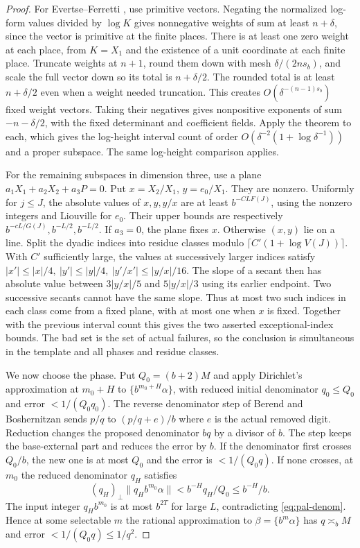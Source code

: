 \begin{proof}
For Evertse--Ferretti \cite[Theorem~3.3]{EF}, use primitive vectors. Negating the normalized log-form values divided by \(\log K\) gives nonnegative weights of sum at least \(n+\delta\), since the vector is primitive at the finite places. There is at least one zero weight at each place, from \(K=X_1\) and the existence of a unit coordinate at each finite place. Truncate weights at \(n+1\), round them down with mesh \(\delta/(2n s_b)\), and scale the full vector down so its total is \(n+\delta/2\). The rounded total is at least \(n+\delta/2\) even when a weight needed truncation. This creates \(O(\delta^{-(n-1)s_b})\) fixed weight vectors. Taking their negatives gives nonpositive exponents of sum \(-n-\delta/2\), with the fixed determinant and coefficient fields. Apply the theorem to each, which gives the log-height interval count of order \(O(\delta^{-2}(1+\log\delta^{-1}))\) and a proper subspace. The same log-height comparison applies.

For the remaining subspaces in dimension three, use a plane \(a_1X_1+a_2X_2+a_3P=0\). Put \(x=X_2/X_1\), \(y=e_0/X_1\). They are nonzero. Uniformly for \(j\le J\), the absolute values of \(x,y,y/x\) are at least \(b^{-C LF(J)}\), using the nonzero integers and Liouville for \(e_0\). Their upper bounds are respectively \(b^{-cL/G(J)}, b^{-L/2}, b^{-L/2}\). If \(a_3=0\), the plane fixes \(x\). Otherwise \((x,y)\) lie on a line. Split the dyadic indices into residue classes modulo \(\lceil C'(1+\log V(J))\rceil\). With \(C'\) sufficiently large, the values at successively larger indices satisfy \(|x'|\le|x|/4,\ |y'|\le|y|/4,\ |y'/x'|\le|y/x|/16\). The slope of a secant then has absolute value between \(3|y/x|/5\) and \(5|y/x|/3\) using its earlier endpoint. Two successive secants cannot have the same slope. Thus at most two such indices in each class come from a fixed plane, with at most one when \(x\) is fixed. Together with the previous interval count this gives the two asserted exceptional-index bounds. The bad set is the set of actual failures, so the conclusion is simultaneous in the template and all phases and residue classes.

We now choose the phase. Put \(Q_0=(b+2)M\) and apply Dirichlet's approximation at \(m_0+H\) to \(\{b^{m_0+H}\alpha\}\), with reduced initial denominator \(q_0\le Q_0\) and error \(<1/(Q_0q_0)\). The reverse denominator step of Berend and Boshernitzan \cite{BBshift} sends \(p/q\) to \((p/q+e)/b\) where \(e\) is the actual removed digit. Reduction changes the proposed denominator \(bq\) by a divisor of \(b\). The step keeps the base-external part and reduces the error by \(b\). If the denominator first crosses \(Q_0/b\), the new one is at most \(Q_0\) and the error is \(<1/(Q_0q)\). If none crosses, at \(m_0\) the reduced denominator \(q_H\) satisfies
\[
 (q_H)_\perp\|q_H b^{m_0}\alpha\|
      <b^{-H}q_H/Q_0\le b^{-H}/b.
\]
The input integer \(q_H b^{m_0}\) is at most \(b^{2T}\) for large \(L\), contradicting \eqref{eq:pal-denom}. Hence at some selectable \(m\) the rational approximation to \(\beta=\{b^m\alpha\}\) has \(q\asymp_b M\) and error \(<1/(Q_0q)\le1/q^2\).
 

\end{proof}
